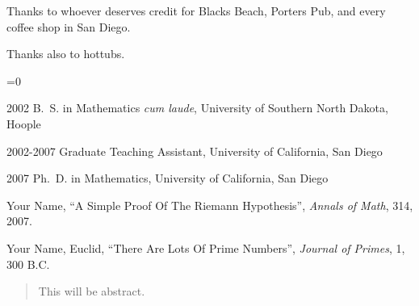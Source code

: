 \begin{frontmatter}
%
\tableofcontents
\listoffigures  %
\listoftables   %



%
%
\begin{acknowledgements}
 Thanks to whoever deserves credit for Blacks Beach, Porters Pub, and
 every coffee shop in San Diego.

 Thanks also to hottubs.
\end{acknowledgements}


%
%
%
 \ifnum{}=0 %
    \begin{vitapage}
    \begin{vita}
      \item[2002] B.~S. in Mathematics \emph{cum laude}, University of Southern North Dakota, Hoople
      \item[2002-2007] Graduate Teaching Assistant, University of California, San Diego
      \item[2007] Ph.~D. in Mathematics, University of California, San Diego
    \end{vita}
    \begin{publications}
      \item Your Name, ``A Simple Proof Of The Riemann Hypothesis'', \emph{Annals of Math}, 314, 2007.
      \item Your Name, Euclid, ``There Are Lots Of Prime Numbers'', \emph{Journal of Primes}, 1, 300 B.C.
    \end{publications}
    \end{vitapage}
\fi

%
%
\begin{abstract}
  This \doctype will be abstract.
\end{abstract}


\end{frontmatter}
